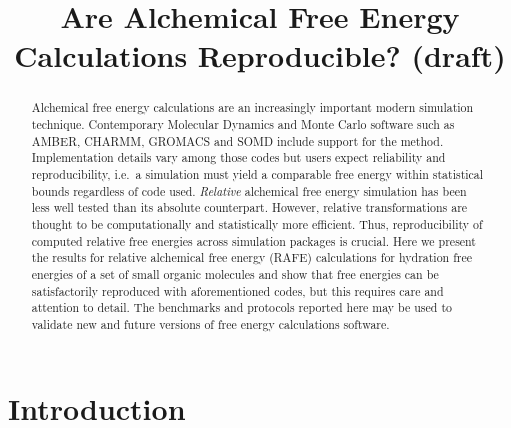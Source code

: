 \documentclass[journal=jctcce,manuscript=article]{achemso}
\title{Are Alchemical Free Energy Calculations Reproducible? (draft)}
\begin{document}
\begin{abstract}
  Alchemical free energy calculations are an increasingly important modern 
  simulation technique.  Contemporary Molecular Dynamics and Monte Carlo 
  software such as AMBER, CHARMM, GROMACS and SOMD include support for the 
  method.  Implementation details vary among those codes but users expect 
  reliability and reproducibility, i.e.\ a simulation must yield a comparable 
  free energy within statistical bounds regardless of code used.  
  \emph{Relative} alchemical free energy simulation has been less well tested 
  than its absolute counterpart.  However, relative transformations are thought 
  to be computationally and statistically more efficient.
  Thus, reproducibility of computed relative free energies across simulation 
  packages is crucial. Here we present the results for relative alchemical free 
  energy (RAFE) calculations for hydration free energies of a set of small 
  organic molecules and show that free energies can be satisfactorily 
  reproduced with aforementioned codes, but this requires care and attention to 
  detail.  The benchmarks and protocols reported here may be used to validate 
  new and future versions of free energy calculations software.  
\end{abstract}

\begin{tocentry}
\end{tocentry}







\section{Introduction}
\label{sec:intro}
\end{document}
